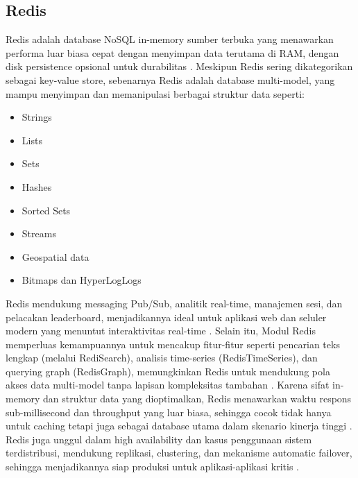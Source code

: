 \subsection{Redis}
Redis adalah database NoSQL in-memory sumber terbuka yang menawarkan performa luar biasa cepat dengan menyimpan data terutama di RAM, dengan disk persistence opsional untuk durabilitas \citep[p.~7]{suehring2021redis}. Meskipun Redis sering dikategorikan sebagai key-value store, sebenarnya Redis adalah database multi-model, yang mampu menyimpan dan memanipulasi berbagai struktur data seperti:
\begin{itemize}
  \item Strings
  \item Lists
  \item Sets
  \item Hashes
  \item Sorted Sets
  \item Streams
  \item Geospatial data
  \item Bitmaps dan HyperLogLogs \citep[pp.~32-38]{suehring2021redis}
\end{itemize}
\singlespacing{}
Redis mendukung messaging Pub/Sub, analitik real-time, manajemen sesi, dan pelacakan leaderboard, menjadikannya ideal untuk aplikasi web dan seluler modern yang menuntut interaktivitas real-time \citep[pp.~11-15]{suehring2021redis}.
\singlespacing{}
Selain itu, Modul Redis memperluas kemampuannya untuk mencakup fitur-fitur seperti pencarian teks lengkap (melalui RediSearch), analisis time-series (RedisTimeSeries), dan querying graph (RedisGraph), memungkinkan Redis untuk mendukung pola akses data multi-model tanpa lapisan kompleksitas tambahan \citep[pp.~41-43]{suehring2021redis}. Karena sifat in-memory dan struktur data yang dioptimalkan, Redis menawarkan waktu respons sub-millisecond dan throughput yang luar biasa, sehingga cocok tidak hanya untuk caching tetapi juga sebagai database utama dalam skenario kinerja tinggi \citep[p.~12]{suehring2021redis}.
\singlespacing{}
Redis juga unggul dalam high availability dan kasus penggunaan sistem terdistribusi, mendukung replikasi, clustering, dan mekanisme automatic failover, sehingga menjadikannya siap produksi untuk aplikasi-aplikasi kritis \citep[p.~46]{suehring2021redis}.